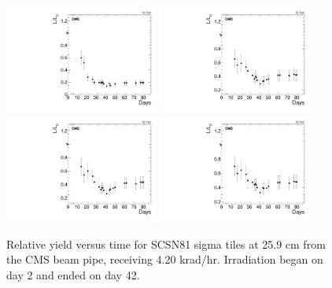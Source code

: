 \begin{figure}[tbp!]
\centering
\includegraphics[width=0.45\textwidth]{figures/SCSN81-S-25p9cm-f7ch2-time.pdf}
\includegraphics[width=0.45\textwidth]{figures/SCSN81-S-25p9cm-f8ch5-time.pdf}
\includegraphics[width=0.45\textwidth]{figures/SCSN81-S-25p9cm-f14ch3-time.pdf}
\includegraphics[width=0.45\textwidth]{figures/SCSN81-S-25p9cm-f16ch1-time.pdf}
\caption{Relative yield versus time for SCSN81 sigma tiles at 25.9 cm from the CMS beam pipe, receiving 4.20 krad/hr. Irradiation began on day 2 and ended on day 42.}
\label{fig:SCSN81-S-25p9cm-time}
\end{figure} 

